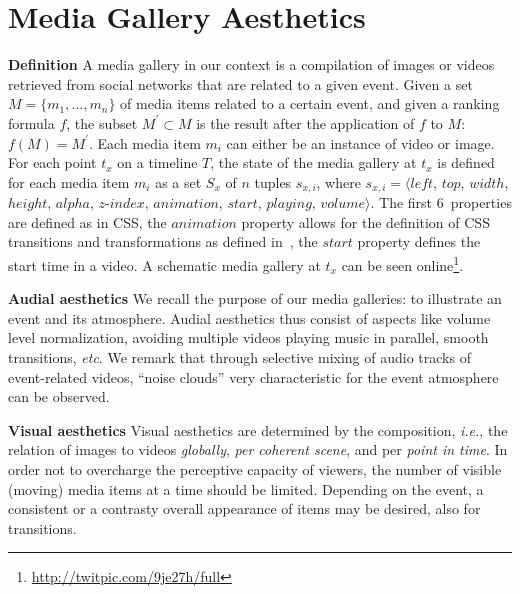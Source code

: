 \documentclass{article}
\let\oldsection\section
\renewcommand{\section}[1]{\oldsection{#1}\vspace{-0.95em}}
\begin{document}
\vspace{-0.95em}
\section{Media Gallery Aesthetics}

\noindent \textbf{Definition}
A media gallery in our context is a compilation of images or videos
retrieved from social networks that are related to a given event.
Given a set $M = \{m_1,..., m_n\}$ of media items related to a certain event,
and given a ranking formula $f$,
the subset $M^\prime \subset M$
is the result after the application of $f$ to $M$: $f(M)=M^\prime$.
Each media item $m_i$ can either be an instance of video or image.
For each point $t_x$ on a timeline $T$, the state of the media gallery
at $t_x$ is defined for each media item $m_i$
as a set $S_x$ of $n$ tuples $s_{x,i}$, where
$s_{x,i}=\langle \mathit{left}$, $\mathit{top}$, $\mathit{width}$, $\mathit{height}$,
$\mathit{alpha}$, $\mathit{z\mbox{-}index}$, $\mathit{animation}$,
$\mathit{start}$, $\mathit{playing}$, $\mathit{volume} \rangle$.
The first 6~properties are defined as in CSS, the $\mathit{animation}$ property
allows for the definition of CSS transitions
and transformations as defined in~\cite{CSSTransitions2009,CSSTransforms2012},
the $\mathit{start}$ property defines the start time in a video.
A schematic media gallery at $t_x$ can be seen online\footnote{\url{http://twitpic.com/9je27h/full}}.

\noindent \textbf{Audial aesthetics}
We recall the purpose of our media galleries:
to illustrate an event and its atmosphere.
Audial aesthetics thus consist of aspects like volume level normalization,
avoiding multiple videos playing music in parallel, smooth transitions, \emph{etc}.
We remark that through selective mixing of audio tracks
of event-related videos, ``noise clouds'' very characteristic
for the event atmosphere can be observed.

\noindent \textbf{Visual aesthetics}
Visual aesthetics are determined by the composition, \emph{i.e.},
the relation of images to videos \emph{globally}, \emph{per coherent scene},
and per \emph{point in time}.
In order not to overcharge the perceptive capacity
of viewers, the number of visible (moving) media items
at a time should be limited.
Depending on the event, a consistent or a contrasty overall
appearance of items may be desired, also for transitions.

\vspace{-0.95em}
\end{document}
